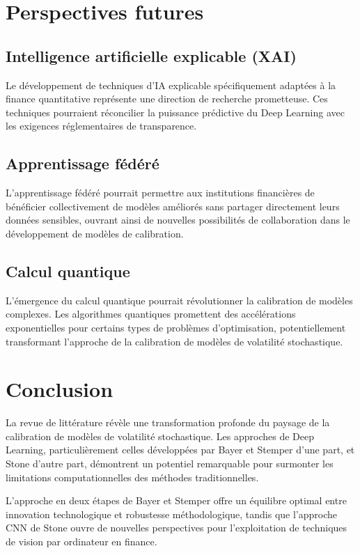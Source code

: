 \section{Perspectives futures}

\subsection{Intelligence artificielle explicable (XAI)}

Le développement de techniques d'IA explicable spécifiquement adaptées à la finance quantitative représente une direction de recherche prometteuse. Ces techniques pourraient réconcilier la puissance prédictive du Deep Learning avec les exigences réglementaires de transparence.

\subsection{Apprentissage fédéré}

L'apprentissage fédéré pourrait permettre aux institutions financières de bénéficier collectivement de modèles améliorés sans partager directement leurs données sensibles, ouvrant ainsi de nouvelles possibilités de collaboration dans le développement de modèles de calibration.

\subsection{Calcul quantique}

L'émergence du calcul quantique pourrait révolutionner la calibration de modèles complexes. Les algorithmes quantiques promettent des accélérations exponentielles pour certains types de problèmes d'optimisation, potentiellement transformant l'approche de la calibration de modèles de volatilité stochastique.

\section{Conclusion}

La revue de littérature révèle une transformation profonde du paysage de la calibration de modèles de volatilité stochastique. Les approches de Deep Learning, particulièrement celles développées par Bayer et Stemper d'une part, et Stone d'autre part, démontrent un potentiel remarquable pour surmonter les limitations computationnelles des méthodes traditionnelles.

L'approche en deux étapes de Bayer et Stemper offre un équilibre optimal entre innovation technologique et robustesse méthodologique, tandis que l'approche CNN de Stone ouvre de nouvelles perspectives pour l'exploitation de techniques de vision par ordinateur en finance.

